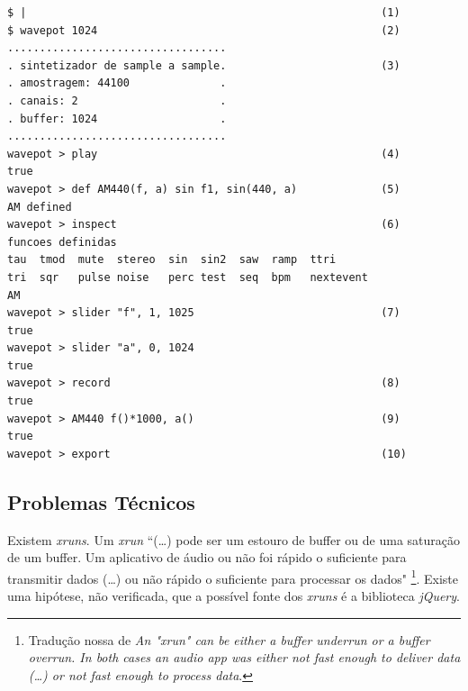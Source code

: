 \begin{listing}
\begin{verbatim}
$ |                                                       (1)
$ wavepot 1024                                            (2)
..................................
. sintetizador de sample a sample.                        (3) 
. amostragem: 44100              .
. canais: 2                      .
. buffer: 1024                   .
..................................
wavepot > play                                            (4)                                                      
true
wavepot > def AM440(f, a) sin f1, sin(440, a)             (5)
AM defined
wavepot > inspect                                         (6)
funcoes definidas 
tau  tmod  mute  stereo  sin  sin2  saw  ramp  ttri
tri  sqr   pulse noise	 perc test  seq  bpm   nextevent
AM
wavepot > slider "f", 1, 1025                             (7)
true
wavepot > slider "a", 0, 1024            
true
wavepot > record                                          (8)
true
wavepot > AM440 f()*1000, a()                             (9)
true
wavepot > export                                          (10)
\end{verbatim}
\tiny{\caption{Console do \emph{Termpot} aguardando dados de entrada do improvisador (1).\emph{Boot} do ambiente \emph{wavepot} com um buffer de 1024 amostras por ciclo de DSP (2). Informações diversas do sistema (3). Início do processamento de áudio (4). O improvisador define uma função \emph{AM440} (5). O sistema informa as funções diponíveis (6). Definição de interfaces gráficas controladoras (7). Comando para gravar o processamento em um arquivo (8). Execução da função \emph{AM440} com controles (9). Realizar o download da gravação (10)}}
\label{code:resultados}
\end{listing}

\subsection*{Problemas Técnicos}

Existem \emph{xruns}. Um \emph{xrun} ``(\ldots) pode ser um estouro de buffer ou de uma saturação de um buffer. Um aplicativo de áudio ou não foi rápido o suficiente para transmitir dados (\ldots) ou não rápido o suficiente para processar os dados" \cite{markc_xruns_2013}\footnote{Tradução nossa de \emph{An "xrun" can be either a buffer underrun or a buffer overrun. In both cases an audio app was either not fast enough to deliver data (\ldots)  or not fast enough to process data}.}. Existe uma hipótese, não verificada, que a possível fonte dos \emph{xruns} é a biblioteca \emph{jQuery}. 